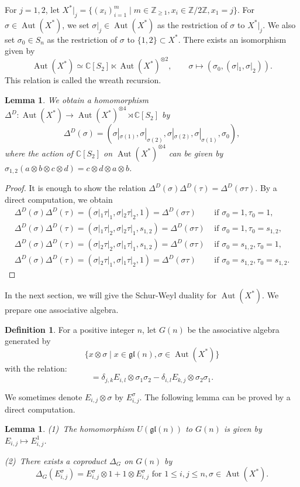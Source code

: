 \documentclass{article}
\newtheorem{Lemma}[equation]{Lemma}
\theoremstyle{definition}
\newtheorem{Definition}[equation]{Definition}
\theoremstyle{remark}
\numberwithin{equation}{section}
\DeclareMathOperator{\Aut}{Aut}
\numberwithin{equation}{section}
\begin{document}
For $j=1,2$, let $X^{*}|_j=\{(x_i)_{i=1}^m\mid m\in\mathbb{Z}_{\geq1},x_i\in\mathbb{Z}/2\mathbb{Z},x_1=j\}$. For $\sigma\in\Aut(X^*)$, we set $\sigma|_j\in\Aut(X^*)$ as the restriction of $\sigma$ to $X^{*}|_j$. We also set $\sigma_0\in S_n$ as the restriction of $\sigma$ to $\{1,2\}\subset X^*$. There exists an isomorphism
given by
\[\Aut(X^*)\simeq\mathbb{C}[S_2]\ltimes\Aut(X^*)^{\otimes 2},\qquad\sigma\mapsto(\sigma_0,(\sigma|_1,\sigma|_2)).\]
This relation is called the wreath recursion. 
\begin{Lemma}\label{Lem3.3}
We obtain a homomorphism $\Delta^D\colon\Aut(X^*)\to\Aut(X^*)^{\otimes4}\rtimes\mathbb{C}[S_2]$ by
\[\Delta^D(\sigma)=(\sigma|_{\sigma(1)},\sigma|_{\sigma(2)},\sigma|_{\sigma(2)},\sigma|_{\sigma(1)},\sigma_0),\]
where the action of $\mathbb{C}[S_2]$ on $\Aut(X^*)^{\otimes4}$ can be given by $\sigma_{1,2}(a\otimes b\otimes c\otimes d)=c\otimes d\otimes a\otimes b$.
\end{Lemma}
\begin{proof}
It is enough to show the relation $\Delta^D(\sigma)\Delta^D(\tau)=\Delta^D(\sigma\tau)$. By a direct computation, we obtain
\begin{align*}
\Delta^D(\sigma)\Delta^D(\tau)=(\sigma|_1\tau|_1,\sigma|_2\tau|_2,1)=\Delta^D(\sigma\tau)&\text{ if }\sigma_0=1,\tau_0=1,\\
\Delta^D(\sigma)\Delta^D(\tau)=(\sigma|_1\tau|_2,\sigma|_2\tau|_1,s_{1,2})=\Delta^D(\sigma\tau)&\text{ if }\sigma_0=1,\tau_0=s_{1,2},\\
\Delta^D(\sigma)\Delta^D(\tau)=(\sigma|_2\tau|_2,\sigma|_1\tau|_1,s_{1,2})=\Delta^D(\sigma\tau)&\text{ if }\sigma_0=s_{1,2},\tau_0=1,\\
\Delta^D(\sigma)\Delta^D(\tau)=(\sigma|_2\tau|_1,\sigma|_1\tau|_2,1)=\Delta^D(\sigma\tau)&\text{ if }\sigma_0=s_{1,2},\tau_0=s_{1,2}.
\end{align*}
\end{proof}
In the next section, we will give the Schur-Weyl duality for $\Aut(X^*)$. We prepare one associative algebra.
\begin{Definition}\label{Def907}
For a positive integer $n$, let $G(n)$ be the associative algebra generated by
\[
\{x\otimes\sigma\mid x\in\mathfrak{gl}(n),\sigma\in\Aut(X^*)\}
\]
with the relation:
\begin{equation}
[E_{i,j}\otimes\sigma_1,E_{k,l}\otimes\sigma_2]=\delta_{j,k}E_{i,l}\otimes\sigma_1\sigma_2-\delta_{i,l}E_{k,j}\otimes\sigma_2\sigma_1.\label{def1}
\end{equation}
\end{Definition}
We sometimes denote $E_{i,j}\otimes\sigma$ by $E^\sigma_{i,j}$. The following lemma can be proved by a direct computation.
\begin{Lemma}\label{lem1}
\textup{(1)}\ The homomorphism $U(\mathfrak{gl}(n))$ to $G(n)$ is given by $E_{i,j}\mapsto E^1_{i,j}$.

\textup{(2)}\ There exists a coproduct $\Delta_G$ on $G(n)$ by
\begin{equation}
\Delta_G(E^\sigma_{i,j})=E_{i,j}^\sigma\otimes1+1\otimes E^\sigma_{i,j}\text{ for }1\leq i,j\leq n,\sigma\in \Aut(X^*).
\end{equation} 
\end{Lemma}
\end{document}
